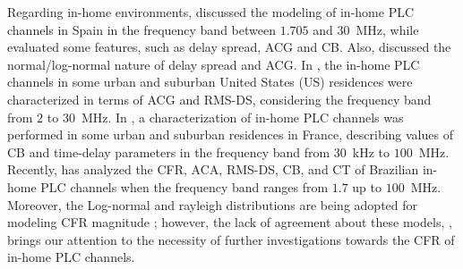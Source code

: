 \documentclass[journal]{IEEEtran}
\begin{document}
Regarding in-home environments, \cite{Canete:Model} discussed the modeling of in-home \ac{PLC} channels in Spain in the frequency band between $1.705$ and $30$~MHz, while \cite{Canete:PLC} evaluated some features, such as delay spread, \ac{ACG} and \ac{CB}. Also, \cite{Cortes:PLC} discussed the normal/log-normal nature of delay spread and \ac{ACG}. In \cite{GalliUS,Galli:Wireline}, the in-home \ac{PLC} channels in some urban and suburban United States (US) residences were characterized in terms of \ac{ACG} and \ac{RMS-DS}, considering the frequency band from $2$ to $30$~MHz. In \cite{Tlich:Indoor}, a characterization of in-home \ac{PLC} channels was performed in some urban and suburban residences in France, describing values of \ac{CB} and time-delay parameters in the frequency band from $30$~kHz to $100$~MHz. Recently, \cite{Thiago:Characterization} has analyzed the \ac{CFR}, \ac{ACA}, \ac{RMS-DS}, \ac{CB}, and \ac{CT} of Brazilian in-home \ac{PLC} channels when the frequency band ranges from $1.7$ up to $100$~MHz.  Moreover, the Log-normal and rayleigh distributions are being adopted for modeling \ac{CFR} magnitude \cite{Galli:Wireline,RayleighPLC}; however, the lack of agreement about these models, \cite{Cortes:PLC}, brings our attention to the necessity of further investigations towards the \ac{CFR} of in-home \ac{PLC} channels. 

\end{document}

